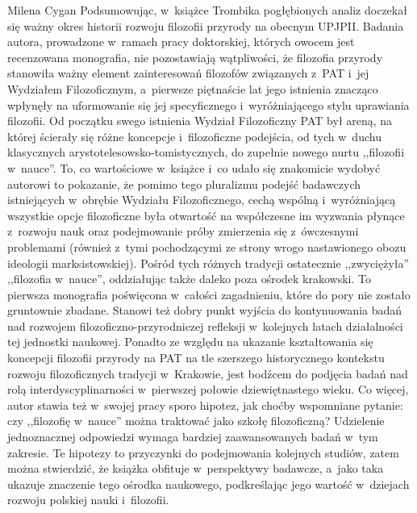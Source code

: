 \begin{newrevplenv}{Milena Cygan}
Podsumowując, w~książce Trombika pogłębionych analiz doczekał się ważny okres historii rozwoju filozofii przyrody na obecnym UPJPII. Badania autora, prowadzone w~ramach pracy doktorskiej, których owocem jest recenzowana monografia, nie pozostawiają wątpliwości, że filozofia przyrody stanowiła ważny element zainteresowań filozofów związanych z~PAT i~jej Wydziałem Filozoficznym, a~pierwsze piętnaście lat jego istnienia znacząco wpłynęły na uformowanie się jej specyficznego i~wyróżniającego stylu uprawiania filozofii. Od początku swego istnienia Wydział Filozoficzny PAT był areną, na której ścierały się różne koncepcje i~filozoficzne podejścia, od tych w~duchu klasycznych arystotelesowsko-tomistycznych, do zupełnie nowego nurtu ,,filozofii w~nauce''. To, co wartościowe w~książce i~co udało się znakomicie wydobyć autorowi to pokazanie, że pomimo tego pluralizmu podejść badawczych istniejących w~obrębie Wydziału Filozoficznego, cechą wspólną i~wyróżniającą wszystkie opcje filozoficzne była otwartość na współczesne im wyzwania płynące z~rozwoju nauk oraz podejmowanie próby zmierzenia się z~ówczesnymi problemami (również z~tymi pochodzącymi ze strony wrogo nastawionego obozu ideologii marksistowskiej). Pośród tych różnych tradycji ostatecznie ,,zwyciężyła'' ,,filozofia w~nauce'', oddziałując także daleko poza ośrodek krakowski. To pierwsza monografia poświęcona w~całości zagadnieniu, które do pory nie zostało gruntownie zbadane. Stanowi też dobry punkt wyjścia do kontynuowania badań nad rozwojem filozoficzno-przyrodniczej refleksji w~kolejnych latach działalności tej jednostki naukowej. Ponadto ze względu na ukazanie kształtowania się koncepcji filozofii przyrody na PAT na tle szerszego historycznego kontekstu rozwoju filozoficznych tradycji w~Krakowie, jest bodźcem do podjęcia badań nad rolą interdyscyplinarności w~pierwszej połowie dziewiętnastego wieku. Co więcej, autor stawia też w~swojej pracy sporo hipotez, jak choćby wspomniane pytanie: czy ,,filozofię w~nauce'' można traktować jako szkołę filozoficzną? Udzielenie jednoznacznej odpowiedzi wymaga bardziej zaawansowanych badań w~tym zakresie. Te hipotezy to przyczynki do podejmowania kolejnych studiów, zatem można stwierdzić, że książka obfituje w~perspektywy badawcze, a~jako taka ukazuje znaczenie tego ośrodka naukowego, podkreślając jego wartość w~dziejach rozwoju polskiej nauki i~filozofii.




\vspace{5mm}%
\begin{flushright}
{\chaptitleeng\color{black!50}{Between tradition and modernity -- Lorem ipsum}}
\end{flushright}


\end{newrevplenv}
